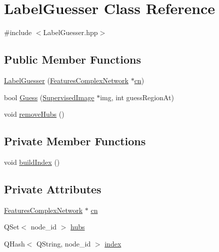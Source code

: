\hypertarget{class_label_guesser}{\section{Label\+Guesser Class Reference}
\label{class_label_guesser}
}


{\ttfamily \#include $<$Label\+Guesser.\+hpp$>$}

\subsection*{Public Member Functions}
\begin{DoxyCompactItemize}
\item 
\hyperlink{class_label_guesser_ad40858173b453bf95a7cd9798ff6a941}{Label\+Guesser} (\hyperlink{class_features_complex_network}{Features\+Complex\+Network} $\ast$\hyperlink{class_label_guesser_acdd5ba09b2a6aa6fadc4b64798bd4e75}{cn})
\item 
bool \hyperlink{class_label_guesser_a83c7361e8308a2347814a418c6165615}{Guess} (\hyperlink{class_supervised_image}{Supervised\+Image} $\ast$img, int guess\+Region\+At)
\item 
void \hyperlink{class_label_guesser_a34aabd99a651c08cd66df1ffa27767e5}{remove\+Hubs} ()
\end{DoxyCompactItemize}
\subsection*{Private Member Functions}
\begin{DoxyCompactItemize}
\item 
void \hyperlink{class_label_guesser_a28aeaaf6c7b4d8faeed2cd2f69da49a3}{build\+Index} ()
\end{DoxyCompactItemize}
\subsection*{Private Attributes}
\begin{DoxyCompactItemize}
\item 
\hyperlink{class_features_complex_network}{Features\+Complex\+Network} $\ast$ \hyperlink{class_label_guesser_acdd5ba09b2a6aa6fadc4b64798bd4e75}{cn}
\item 
Q\+Set$<$ node\+\_\+id $>$ \hyperlink{class_label_guesser_a9a1306e306ecf90e6d886a45a1ed16f7}{hubs}
\item 
Q\+Hash$<$ Q\+String, node\+\_\+id $>$ \hyperlink{class_label_guesser_ae88b5f0ad103084c7c8d7326c4bd7251}{index}
\end{DoxyCompactItemize}


